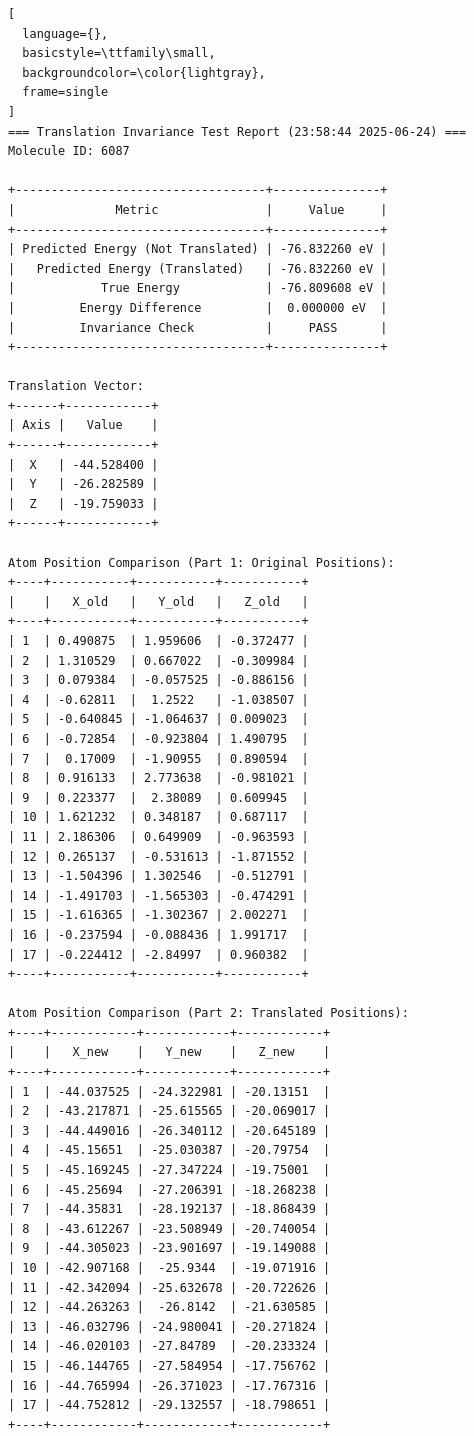 \documentclass{article}
\begin{document}
\begin{lstlisting}[
  language={},
  basicstyle=\ttfamily\small,
  backgroundcolor=\color{lightgray},
  frame=single
]
=== Translation Invariance Test Report (23:58:44 2025-06-24) ===
Molecule ID: 6087

+-----------------------------------+---------------+
|              Metric               |     Value     |
+-----------------------------------+---------------+
| Predicted Energy (Not Translated) | -76.832260 eV |
|   Predicted Energy (Translated)   | -76.832260 eV |
|            True Energy            | -76.809608 eV |
|         Energy Difference         |  0.000000 eV  |
|         Invariance Check          |     PASS      |
+-----------------------------------+---------------+

Translation Vector:
+------+------------+
| Axis |   Value    |
+------+------------+
|  X   | -44.528400 |
|  Y   | -26.282589 |
|  Z   | -19.759033 |
+------+------------+

Atom Position Comparison (Part 1: Original Positions):
+----+-----------+-----------+-----------+
|    |   X_old   |   Y_old   |   Z_old   |
+----+-----------+-----------+-----------+
| 1  | 0.490875  | 1.959606  | -0.372477 |
| 2  | 1.310529  | 0.667022  | -0.309984 |
| 3  | 0.079384  | -0.057525 | -0.886156 |
| 4  | -0.62811  |  1.2522   | -1.038507 |
| 5  | -0.640845 | -1.064637 | 0.009023  |
| 6  | -0.72854  | -0.923804 | 1.490795  |
| 7  |  0.17009  | -1.90955  | 0.890594  |
| 8  | 0.916133  | 2.773638  | -0.981021 |
| 9  | 0.223377  |  2.38089  | 0.609945  |
| 10 | 1.621232  | 0.348187  | 0.687117  |
| 11 | 2.186306  | 0.649909  | -0.963593 |
| 12 | 0.265137  | -0.531613 | -1.871552 |
| 13 | -1.504396 | 1.302546  | -0.512791 |
| 14 | -1.491703 | -1.565303 | -0.474291 |
| 15 | -1.616365 | -1.302367 | 2.002271  |
| 16 | -0.237594 | -0.088436 | 1.991717  |
| 17 | -0.224412 | -2.84997  | 0.960382  |
+----+-----------+-----------+-----------+

Atom Position Comparison (Part 2: Translated Positions):
+----+------------+------------+------------+
|    |   X_new    |   Y_new    |   Z_new    |
+----+------------+------------+------------+
| 1  | -44.037525 | -24.322981 | -20.13151  |
| 2  | -43.217871 | -25.615565 | -20.069017 |
| 3  | -44.449016 | -26.340112 | -20.645189 |
| 4  | -45.15651  | -25.030387 | -20.79754  |
| 5  | -45.169245 | -27.347224 | -19.75001  |
| 6  | -45.25694  | -27.206391 | -18.268238 |
| 7  | -44.35831  | -28.192137 | -18.868439 |
| 8  | -43.612267 | -23.508949 | -20.740054 |
| 9  | -44.305023 | -23.901697 | -19.149088 |
| 10 | -42.907168 |  -25.9344  | -19.071916 |
| 11 | -42.342094 | -25.632678 | -20.722626 |
| 12 | -44.263263 |  -26.8142  | -21.630585 |
| 13 | -46.032796 | -24.980041 | -20.271824 |
| 14 | -46.020103 | -27.84789  | -20.233324 |
| 15 | -46.144765 | -27.584954 | -17.756762 |
| 16 | -44.765994 | -26.371023 | -17.767316 |
| 17 | -44.752812 | -29.132557 | -18.798651 |
+----+------------+------------+------------+


\end{lstlisting}
\end{document}
